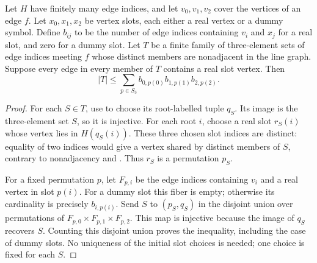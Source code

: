 \begin{lemma}
Let $H$ have finitely many edge indices, and let $v_0,v_1,v_2$ cover
the vertices of an edge $f$. Let $x_0,x_1,x_2$ be vertex slots, each
either a real vertex or a dummy symbol. Define $b_{ij}$ to be the
number of edge indices containing $v_i$ and $x_j$ for a real slot,
and zero for a dummy slot. Let $T$ be a finite family of three-element
sets of edge indices meeting $f$ whose distinct members are nonadjacent in the
line graph. Suppose every edge in every member of $T$ contains a real
slot vertex. Then
\[
|T|\le \sum_{p\in S_3} b_{0,p(0)}b_{1,p(1)}b_{2,p(2)}.
\]
\end{lemma}
\begin{proof}
For each $S\in T$, use 
to choose its root-labelled tuple $q_S$. Its image is the three-element
set $S$, so it is injective. For each root $i$, choose a real slot
$r_S(i)$ whose vertex lies in $H(q_S(i))$. These three chosen slot
indices are distinct: equality of two indices would give a vertex
shared by distinct members of $S$, contrary to nonadjacency and
. Thus $r_S$ is a permutation $p_S$.

For a fixed permutation $p$, let $F_{p,i}$ be the edge indices containing
$v_i$ and a real vertex in slot $p(i)$. For a dummy slot this fiber is
empty; otherwise its cardinality is precisely $b_{i,p(i)}$.
Send $S$ to $(p_S,q_S)$ in the disjoint union over permutations of
$F_{p,0}\times F_{p,1}\times F_{p,2}$. This map is injective because
the image of $q_S$ recovers $S$. Counting this disjoint union proves
the inequality, including the case of dummy slots. No uniqueness of
the initial slot choices is needed; one choice is fixed for each $S$.
\end{proof}
